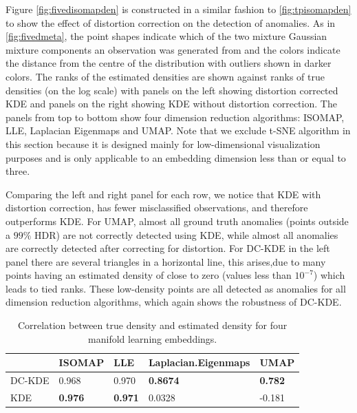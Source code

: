 \documentclass[11pt,a4paper,]{article}
\begin{document}
Figure \autoref{fig:fivedisomapden} is constructed in a similar fashion to \autoref{fig:tpisomapden} to show the effect of distortion correction on the detection of anomalies. As in \autoref{fig:fivedmeta}, the point shapes indicate which of the two mixture Gaussian mixture components an observation was generated from and the colors indicate the distance from the centre of the distribution with outliers shown in darker colors. The ranks of the estimated densities are shown against ranks of true densities (on the log scale) with panels on the left showing distortion corrected KDE and panels on the right showing KDE without distortion correction. The panels from top to bottom show four dimension reduction algorithms: ISOMAP, LLE, Laplacian Eigenmaps and UMAP. Note that we exclude t-SNE algorithm in this section because it is designed mainly for low-dimensional visualization purposes and is only applicable to an embedding dimension less than or equal to three.

Comparing the left and right panel for each row, we notice that KDE with distortion correction, has fewer misclassified observations, and therefore outperforms KDE. For UMAP, almost all ground truth anomalies (points outside a \(99\%\) HDR) are not correctly detected using KDE, while almost all anomalies are correctly detected after correcting for distortion. For DC-KDE in the left panel there are several triangles in a horizontal line, this arises,due to many points having an estimated density of close to zero (values less than \(10^{-7}\)) which leads to tied ranks. These low-density points are all detected as anomalies for all dimension reduction algorithms, which again shows the robustness of DC-KDE.

\begin{table}

\caption{\label{tab:fivedcors}Correlation between true density and estimated density for four manifold learning embeddings.}
\centering
\begin{tabular}[t]{l>{}l>{}l>{}l>{}l}
\toprule
  & ISOMAP & LLE & Laplacian.Eigenmaps & UMAP\\
\midrule
DC-KDE & 0.968 & 0.970 & \textbf{0.8674} & \textbf{0.782}\\
KDE & \textbf{0.976} & \textbf{0.971} & 0.0328 & -0.181\\
\bottomrule
\end{tabular}
\end{table}
\end{document}
